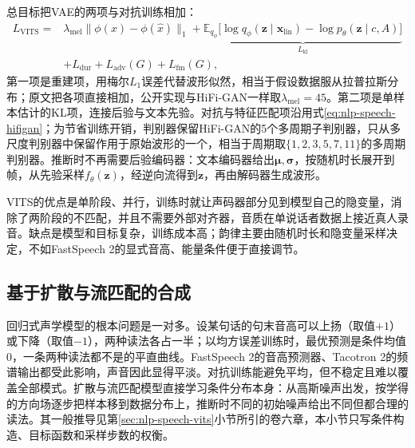 总目标把VAE的两项与对抗训练相加：
\begin{equation}
\begin{aligned}
  L_{\mathrm{VITS}}={}&\lambda_{\mathrm{mel}}\lVert\phi(x)-\phi(\hat x)\rVert_1
  +\underbrace{\mathbb{E}_{q_\phi}\bigl[\log q_\phi(\bm{z}\mid\bm{x}_{\mathrm{lin}})-\log p_\theta(\bm{z}\mid c,A)\bigr]}_{L_{\mathrm{kl}}}\\
  &+L_{\mathrm{dur}}+L_{\mathrm{adv}}(G)+L_{\mathrm{fm}}(G),
\end{aligned}
  \label{eq:nlp-speech-vits-loss}
\end{equation}
第一项是重建项，用梅尔$L_1$误差代替波形似然，相当于假设数据服从拉普拉斯分布；原文把各项直接相加，公开实现与HiFi-GAN一样取$\lambda_{\mathrm{mel}}=45$。第二项是单样本估计的KL项，连接后验与文本先验。对抗与特征匹配项沿用式\eqref{eq:nlp-speech-hifigan}；为节省训练开销，判别器保留HiFi-GAN的5个多周期子判别器，只从多尺度判别器中保留作用于原始波形的一个，相当于周期取$\{1,2,3,5,7,11\}$的多周期判别器。推断时不再需要后验编码器：文本编码器给出$\bm{\mu},\bm{\sigma}$，按随机时长展开到帧，从先验采样$f_\theta(\bm{z})$，经逆向流得到$\bm{z}$，再由解码器生成波形。

VITS的优点是单阶段、并行，训练时就让声码器部分见到模型自己的隐变量，消除了两阶段的不匹配，并且不需要外部对齐器，音质在单说话者数据上接近真人录音。缺点是模型和目标复杂，训练成本高；韵律主要由随机时长和隐变量采样决定，不如FastSpeech 2的显式音高、能量条件便于直接调节。

\subsection{基于扩散与流匹配的合成}
\label{sec:nlp-speech-diffusion-tts}

回归式声学模型的根本问题是一对多。设某句话的句末音高可以上扬（取值$+1$）或下降（取值$-1$），两种读法各占一半；以均方误差训练时，最优预测是条件均值0，一条两种读法都不是的平直曲线。FastSpeech 2的音高预测器、Tacotron 2的频谱输出都受此影响，声音因此显得平淡。对抗训练能避免平均，但不稳定且难以覆盖全部模式。扩散与流匹配模型直接学习条件分布本身：从高斯噪声出发，按学得的方向场逐步把样本移到数据分布上，推断时不同的初始噪声给出不同但都合理的读法。其一般推导见第\ref{sec:nlp-speech-vits}小节所引的卷六章，本小节只写条件构造、目标函数和采样步数的权衡。

